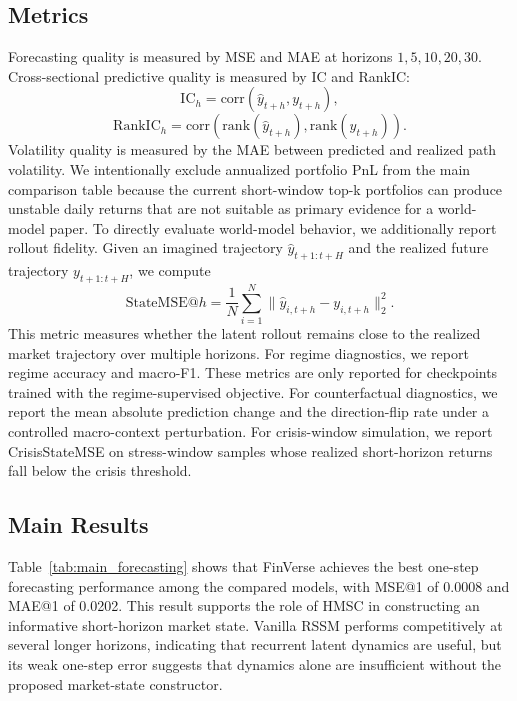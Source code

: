 \documentclass[letterpaper]{article}
\begin{document}
\subsection{Metrics}
Forecasting quality is measured by MSE and MAE at horizons $1,5,10,20,30$. Cross-sectional predictive quality is measured by IC and RankIC:
\begin{equation}
    \mathrm{IC}_h = \mathrm{corr}(\hat{y}_{t+h}, y_{t+h}),
\end{equation}
\begin{equation}
    \mathrm{RankIC}_h = \mathrm{corr}(\mathrm{rank}(\hat{y}_{t+h}), \mathrm{rank}(y_{t+h})).
\end{equation}
Volatility quality is measured by the MAE between predicted and realized path volatility. We intentionally exclude annualized portfolio PnL from the main comparison table because the current short-window top-k portfolios can produce unstable daily returns that are not suitable as primary evidence for a world-model paper.
To directly evaluate world-model behavior, we additionally report rollout fidelity. Given an imagined trajectory $\hat{y}_{t+1:t+H}$ and the realized future trajectory $y_{t+1:t+H}$, we compute
\begin{equation}
    \mathrm{StateMSE}@h =
    \frac{1}{N}\sum_{i=1}^{N}
    \|\hat{y}_{i,t+h} - y_{i,t+h}\|_2^2.
\end{equation}
This metric measures whether the latent rollout remains close to the realized market trajectory over multiple horizons.
For regime diagnostics, we report regime accuracy and macro-F1. These metrics are only reported for checkpoints trained with the regime-supervised objective. For counterfactual diagnostics, we report the mean absolute prediction change and the direction-flip rate under a controlled macro-context perturbation. For crisis-window simulation, we report CrisisStateMSE on stress-window samples whose realized short-horizon returns fall below the crisis threshold.






\subsection{Main Results}
Table~\ref{tab:main_forecasting} shows that FinVerse achieves the best one-step forecasting performance among the compared models, with MSE@1 of 0.0008 and MAE@1 of 0.0202. This result supports the role of HMSC in constructing an informative short-horizon market state. Vanilla RSSM performs competitively at several longer horizons, indicating that recurrent latent dynamics are useful, but its weak one-step error suggests that dynamics alone are insufficient without the proposed market-state constructor.
\end{document}
